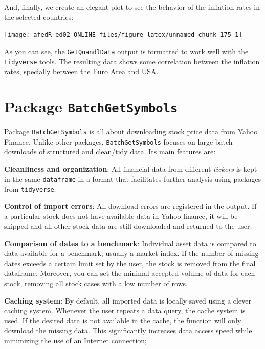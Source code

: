 \documentclass[
  12pt,
]{book}
\begin{document}
And, finally, we create an elegant plot to see the behavior of the inflation rates in the selected countries:

\begin{center}\texttt{[image: afedR\_ed02-ONLINE\_files/figure-latex/unnamed-chunk-175-1]} \end{center}

As you can see, the \texttt{GetQuandlData} output is formatted to work well with the \texttt{tidyverse} tools. The resulting data shows some correlation between the inflation rates, specially between the Euro Area and USA.

\hypertarget{package-batchgetsymbols}{%
\section{\texorpdfstring{Package \texttt{BatchGetSymbols}}{Package BatchGetSymbols}}\label{package-batchgetsymbols}}

Package \texttt{BatchGetSymbols} \citep{R-BatchGetSymbols} is all about downloading stock price data from Yahoo Finance. Unlike other packages, \texttt{BatchGetSymbols} focuses on large batch downloads of structured and clean/tidy data. Its main features are: 

\textbf{Cleanliness and organization}: All financial data from different \emph{tickers} is kept in the same \texttt{dataframe} in a format that facilitates further analysis using packages from \texttt{tidyverse}.

\textbf{Control of import errors}: All download errors are registered in the output. If a particular stock does not have available data in Yahoo finance, it will be skipped and all other stock data are still downloaded and returned to the user;

\textbf{Comparison of dates to a benchmark}: Individual asset data is compared to data available for a benchmark, usually a market index. If the number of missing dates exceeds a certain limit set by the user, the stock is removed from the final dataframe. Moreover, you can set the minimal accepted volume of data for each stock, removing all stock cases with a low number of rows.

\textbf{Caching system}: By default, all imported data is locally saved using a clever caching system. Whenever the user repeats a data query, the cache system is used. If the desired data is not available in the cache, the function will only download the missing data. This significantly increases data access speed while minimizing the use of an Internet connection;
\end{document}
